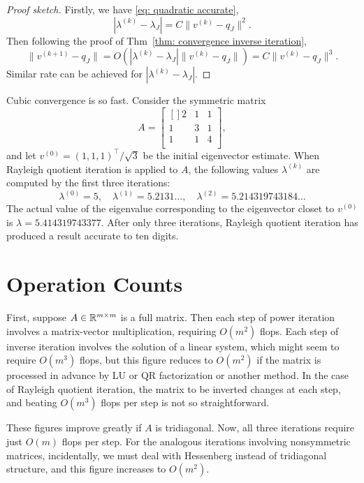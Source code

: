 \begin{proof}[Proof sketch]
Firstly, we have \eqref{eq: quadratic accurate}, 
\[
    |\lambda ^{(k)} - \lambda _J|  = C \|v^{(k)} - q_J\|^2. 
\]
Then following the proof of Thm~\ref{thm: convergence inverse iteration}, 
\[
    \|v^{(k+1)}-q_J\| = O(|\lambda ^{(k)}-\lambda _J| \| v^{(k)}-q_J\|) = C \|v^{(k)}-q_J\|^3. 
\]
Similar rate can be achieved for $|\lambda ^{(k)}-\lambda _J|$. 
\end{proof}


\begin{example}
\label{eg: convergence rate eg}
Cubic convergence is so fast. Consider the symmetric matrix 
\[
    A = \begin{bmatrix}[] 
        2 & 1 &  1 \\
        1 & 3 &  1 \\
        1 & 1 &  4 \\
    \end{bmatrix},  
\]
and let $v^{(0)}=(1,1,1)^\top /\sqrt{3} $ be the initial eigenvector estimate. When Rayleigh quotient iteration is applied to $A$, the following values $ \lambda ^{(k)} $ are computed by the first three iterations: 
\[
    \lambda^{(0)}=5, \quad \lambda^{(1)}=5.2131 \ldots, \quad \lambda^{(2)}=5.214319743184 \ldots
\]
The actual value of the eigenvalue corresponding to the eigenvector closet to $v^{(0)}$ is $\lambda  = 5.414319743377$. After only three iterations, Rayleigh quotient iteration has produced a result accurate to ten digits. 
\end{example}

\section{Operation Counts}
First, suppose $A\in \mathbb{R}^{m\times m}$ is a full matrix. Then each step of power iteration involves a matrix-vector multiplication, requiring $O(m^2)$ flops. Each step of inverse iteration involves the solution of a linear system, which might seem to require $O(m^3)$ flops, but this figure reduces to $O(m^2)$ if the matrix is processed in advance by LU or QR factorization or another method. In the case of Rayleigh quotient iteration, the matrix to be inverted changes at each step, and beating $O(m^3)$ flops per step is not so straightforward.  

These figures improve greatly if $A$ is tridiagonal. Now, all three iterations require just $O(m)$ flops per step. For the analogous iterations involving nonsymmetric matrices, incidentally, we must deal with Hessenberg instead of tridiagonal structure, and this figure increases to $O(m^2)$. 
